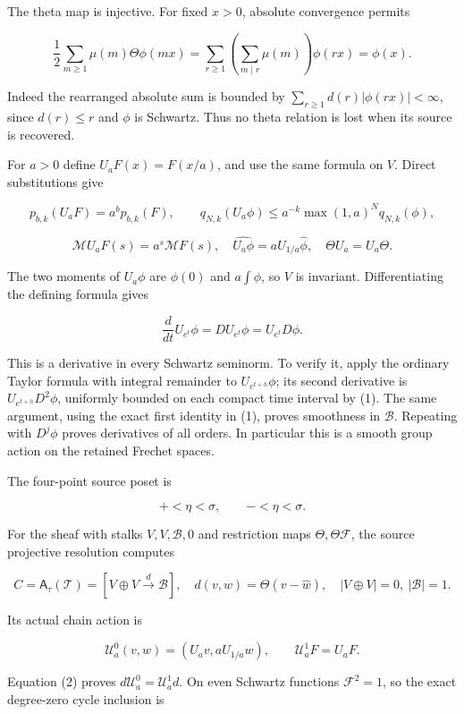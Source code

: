 \documentclass[10pt,a4paper,oneside]{report}
\begin{document}
The theta map is injective. For fixed \(x>0\), absolute convergence
permits

\[
\frac12\sum_{m\geq1}\mu(m)\Theta\phi(mx)
=\sum_{r\geq1}\left(\sum_{m\mid r}\mu(m)\right)\phi(rx)=\phi(x).
\]

Indeed the rearranged absolute sum is bounded by
\(\sum_{r\geq1}d(r)|\phi(rx)|<\infty\), since \(d(r)\leq r\) and
\(\phi\) is Schwartz. Thus no theta relation is lost when its source is
recovered.

For \(a>0\) define \(U_aF(x)=F(x/a)\), and use the same formula on
\(V\). Direct substitutions give

\[
p_{b,k}(U_aF)=a^b p_{b,k}(F),\qquad
q_{N,k}(U_a\phi)\leq a^{-k}\max(1,a)^Nq_{N,k}(\phi),
\tag{1}
\]

\[
\mathcal MU_aF(s)=a^s\mathcal MF(s),\quad
\widehat{U_a\phi}=aU_{1/a}\widehat\phi,\quad
\Theta U_a=U_a\Theta.\tag{2}
\]

The two moments of \(U_a\phi\) are \(\phi(0)\) and \(a\int\phi\), so
\(V\) is invariant. Differentiating the defining formula gives

\[\frac{d}{dt}U_{e^t}\phi=DU_{e^t}\phi=U_{e^t}D\phi.\]

This is a derivative in every Schwartz seminorm. To verify it, apply the
ordinary Taylor formula with integral remainder to \(U_{e^{t+h}}\phi\);
its second derivative is \(U_{e^{t+h}}D^2\phi\), uniformly bounded on
each compact time interval by (1). The same argument, using the exact
first identity in (1), proves smoothness in \(\mathscr B\). Repeating
with \(D^j\phi\) proves derivatives of all orders. In particular this is
a smooth group action on the retained Frechet spaces.

The four-point source poset is

\[+<\eta<\sigma,\qquad -<\eta<\sigma.\]

For the sheaf with stalks \(V,V,\mathscr B,0\) and restriction maps
\(\Theta,\Theta\mathcal F\), the source projective resolution computes

\[
C=\mathsf A_\tau(\mathcal T)
=\left[V\oplus V\xrightarrow{d}\mathscr B\right],
\quad d(v,w)=\Theta(v-\widehat w),\quad |V\oplus V|=0,\ |\mathscr B|=1.
\tag{3}
\]

Its actual chain action is

\[
\mathcal U_a^0(v,w)=(U_av,aU_{1/a}w),\qquad
\mathcal U_a^1F=U_aF.\tag{4}
\]

Equation (2) proves \(d\mathcal U_a^0=\mathcal U_a^1d\). On even
Schwartz functions \(\mathcal F^2=1\), so the exact degree-zero cycle
inclusion is
\end{document}
